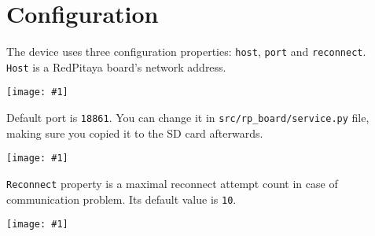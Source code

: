 \documentclass[12pt,a4paper]{article}
\newcommand{\screenshot}[1]{\begin{minipage}[c]{\textwidth}\texttt{[image: \#1]}\end{minipage}}
\begin{document}
	\section{Configuration}
	The device uses three configuration properties: \texttt{host}, \texttt{port} and \texttt{reconnect}.\\
	\texttt{Host} is a RedPitaya board's network address.\\
	\screenshot{screenshots/host.png}
	Default port is \texttt{18861}. You can change it in \texttt{src/rp\_board/service.py} file, making sure you copied it to the SD card afterwards.\\
	\screenshot{screenshots/port.png}
	\texttt{Reconnect} property is a maximal reconnect attempt count in case of communication problem. Its default value is \texttt{10}.\\
	\screenshot{screenshots/reconnect.png}
\end{document}
